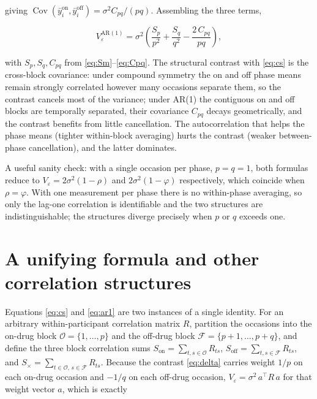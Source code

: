 \documentclass[
  11pt,
]{article}
\begin{document}
giving \(\operatorname{Cov}(\bar y_i^{\text{on}}, \bar
y_i^{\text{off}}) = \sigma^2 C_{pq}/(pq)\). Assembling the three terms,

\begin{equation}
\boxed{\;V_\varepsilon^{\mathrm{AR}(1)}
  = \sigma^2\left(\frac{S_p}{p^2} + \frac{S_q}{q^2}
                  - \frac{2\,C_{pq}}{pq}\right),\;}
\label{eq:ar1}
\end{equation}

with \(S_p, S_q, C_{pq}\) from \eqref{eq:Sm}--\eqref{eq:Cpq}. The
structural contrast with \eqref{eq:cs} is the cross-block covariance:
under compound symmetry the on and off phase means remain strongly
correlated however many occasions separate them, so the contrast
cancels most of the variance; under AR(1) the contiguous on and off
blocks are temporally separated, their covariance \(C_{pq}\) decays
geometrically, and the contrast benefits from little cancellation.
The autocorrelation that helps the phase means (tighter within-block
averaging) hurts the contrast (weaker between-phase cancellation), and
the latter dominates.

A useful sanity check: with a single occasion per phase, \(p = q = 1\),
both formulas reduce to \(V_\varepsilon = 2\sigma^2(1 - \rho)\) and
\(2\sigma^2(1 - \varphi)\) respectively, which coincide when
\(\rho = \varphi\). With one measurement per phase there is no
within-phase averaging, so only the lag-one correlation is
identifiable and the two structures are indistinguishable; the
structures diverge precisely when \(p\) or \(q\) exceeds one.

\section{A unifying formula and other correlation structures}\label{a-unifying-formula-and-other-correlation-structures}

Equations \eqref{eq:cs} and \eqref{eq:ar1} are two instances of a single
identity. For an arbitrary within-participant correlation matrix \(R\),
partition the occasions into the on-drug block
\(\mathcal{O} = \{1, \dots, p\}\) and the off-drug block
\(\mathcal{F} = \{p+1, \dots, p+q\}\), and define the three block
correlation sums
\(S_{\mathrm{on}} = \sum_{t,s \in \mathcal{O}} R_{ts}\),
\(S_{\mathrm{off}} = \sum_{t,s \in \mathcal{F}} R_{ts}\), and
\(S_{\times} = \sum_{t \in \mathcal{O},\, s \in \mathcal{F}} R_{ts}\).
Because the contrast \eqref{eq:delta} carries weight \(1/p\) on each
on-drug occasion and \(-1/q\) on each off-drug occasion,
\(V_\varepsilon = \sigma^2\, a^\top R\, a\) for that weight vector \(a\),
which is exactly
\end{document}
